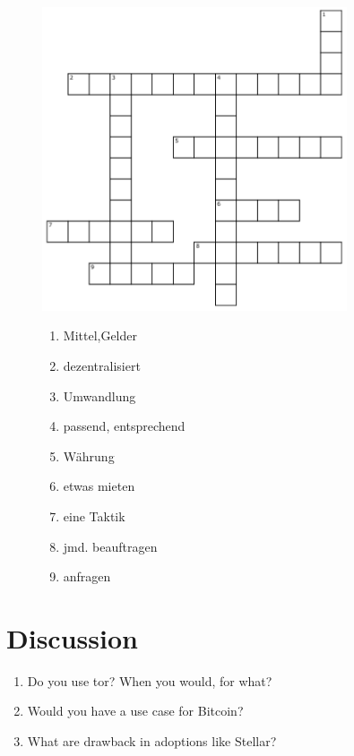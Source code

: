 \documentclass[english, DIV=calc, BCOR=5mm, fontsize=11pt, portrait]{scrartcl}	 %
\begin{document}
\begin{figure}[H]
	\begin{minipage}{9cm}
		\includegraphics[width=9cm]{./img/cw-stellar.png}
	\end{minipage}
	\hfill
	\begin{minipage}{6cm}
		\begin{enumerate}
		\item Mittel,Gelder
		\item dezentralisiert 
		\item Umwandlung
		\item passend, entsprechend
		\item Währung 
		\item etwas mieten 
		\item eine Taktik
		\item jmd. beauftragen
		\item anfragen
		\end{enumerate}
	\end{minipage}
\end{figure}

\section{Discussion}
	
\begin{enumerate}
\item Do you use tor? When you would, for what?
\item Would you have a use case for Bitcoin?
\item What are drawback in adoptions like Stellar?	
\end{enumerate}
\end{document}

